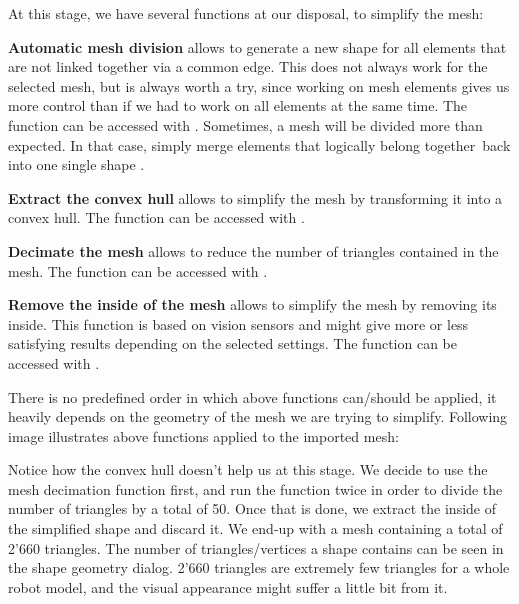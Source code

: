 At this stage, we have several functions at our disposal, to simplify the mesh:
\begin{description}
	\item{\textbf{Automatic mesh division}}
	allows to generate a new shape for all 
	elements that are not linked together via a common edge. This does not 
	always work for the selected mesh, but is always worth a try, since 
	working on mesh elements gives us more control than if we had to work on 
	all elements at the same time. The function can be accessed with
	. Sometimes, a 
	mesh will be divided more than expected. In that case, simply merge 
	elements that logically belong together\ back into one 
	single shape .

	\item{\textbf{Extract the convex hull}} 
	allows to simplify the mesh by transforming
	it into a convex hull. The function can be accessed with
	.

	\item{\textbf{Decimate the mesh}}
	allows to reduce the number of triangles contained
	in the mesh. The function can be accessed with
	.

	\item{\textbf{Remove the inside of the mesh}}
	allows to simplify the mesh by 
	removing its inside. This function is based on vision sensors and might 
	give more or less satisfying results depending on the selected settings. 
	The function can be accessed with
	.
\end{description}

There is no predefined order in which above functions can/should be 
applied, it heavily depends on the geometry of the mesh we are trying to 
simplify. Following image illustrates above functions applied to the imported 
mesh:

\pagebreak

Notice how the convex hull doesn't help us at this stage. We decide to use the 
mesh decimation function first, and run the function twice in order to divide 
the number of triangles by a total of 50. Once that is done, we extract the 
inside of the simplified shape and discard it. We end-up with a mesh containing
a total of 2'660 triangles. The number of triangles/vertices a shape contains can 
be seen in the shape geometry dialog. 2'660 triangles are extremely few 
triangles for a whole robot model, and the visual appearance might suffer a
little bit from it.

